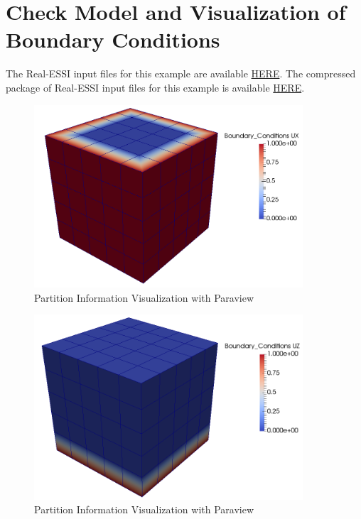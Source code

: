 \section{Check Model and Visualization of Boundary Conditions}
\label{Check_Model_and_Visualization_of_Boundary_Conditions}

The Real-ESSI input files for this example are available 
\href{http://cml01.engr.ucdavis.edu/shortCourse/Day1/Check_Model_and_Visualization_of_Boundary_Conditions}{HERE}. 
The compressed package of Real-ESSI input files for this example is available 
\href{http://cml01.engr.ucdavis.edu/shortCourse/Day1/Check_Model_and_Visualization_of_Boundary_Conditions/Check_Model_and_Visualization_of_Boundary_Conditions.tgz}{HERE}. 

\begin{figure}[H]
  \centering
  \includegraphics[width = 10cm]{./Figure-files/Day1/Check_Model_and_Visualization_of_Boundary_Conditions/boundary_ux.png}
  \caption{Partition Information Visualization with Paraview}
  \label{fig_check_model_and_boundary_condition_ux}
\end{figure}



\begin{figure}[H]
  \centering
  \includegraphics[width = 10cm]{./Figure-files/Day1/Check_Model_and_Visualization_of_Boundary_Conditions/boundary_uz.png}
  \caption{Partition Information Visualization with Paraview}
  \label{fig_check_model_and_boundary_condition_uz}
\end{figure}




